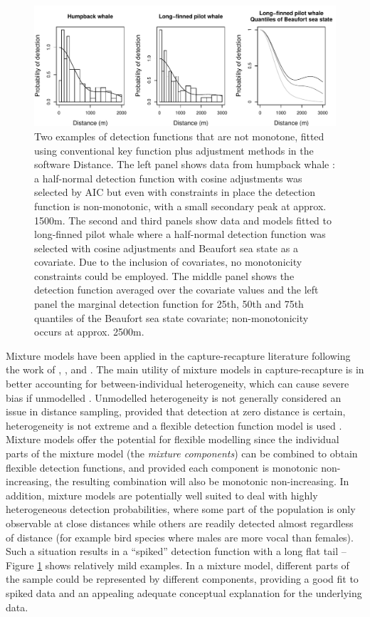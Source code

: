 \documentclass[useAMS,referee,usenatbib]{biom}
\begin{document}
\begin{figure}
\centering
\includegraphics[width=\textwidth]{figs/figure1.pdf}
\caption{Two examples of detection functions that are not monotone, fitted using conventional key function plus adjustment methods in the software Distance. The left panel shows data from humpback whale \citep{Williams:2007tc}: a half-normal detection function with cosine adjustments was selected by AIC but even with constraints in place the detection function is non-monotonic, with a small secondary peak at approx. 1500m. The second and third panels show data and models fitted to long-finned pilot whale \citep{Pike:2003ug} where a half-normal detection function was selected with cosine adjustments and Beaufort sea state as a covariate. Due to the inclusion of covariates, no monotonicity constraints could be employed.  The middle panel shows the detection function averaged over the covariate values and the left panel the marginal detection function for 25th, 50th and 75th quantiles of the Beaufort sea state covariate; non-monotonicity occurs at approx. 2500m.}
\label{fig1}
\end{figure}

Mixture models have been applied in the capture-recapture literature following the work of \cite{Pledger:2000tc}, \cite{Dorazio:2003uf}, \cite{Pledger:2005wy} and \cite{Morgan:2008wy}. The main utility of mixture models in capture-recapture is in better accounting for between-individual heterogeneity, which can cause severe bias if unmodelled \citep{Link:2003wo}. Unmodelled heterogeneity is not generally considered an issue in distance sampling, provided that detection at zero distance is certain, heterogeneity is not extreme and a flexible detection function model is used \citep[][Section 11.12]{Buckland:2004ts}. Mixture models offer the potential for flexible modelling since the individual parts of the mixture model (the \textit{mixture components}) can be combined to obtain flexible detection functions, and provided each component is monotonic non-increasing, the resulting combination will also be monotonic non-increasing. In addition, mixture models are potentially well suited to deal with highly heterogeneous detection probabilities, where some part of the population is only observable at close distances while others are readily detected almost regardless of distance (for example bird species where males are more vocal than females). Such a situation results in a ``spiked'' detection function with a long flat tail -- Figure \ref{fig1} shows relatively mild examples. In a mixture model, different parts of the sample could be represented by different components, providing a good fit to spiked data and an appealing adequate conceptual explanation for the underlying data.
\end{document}
